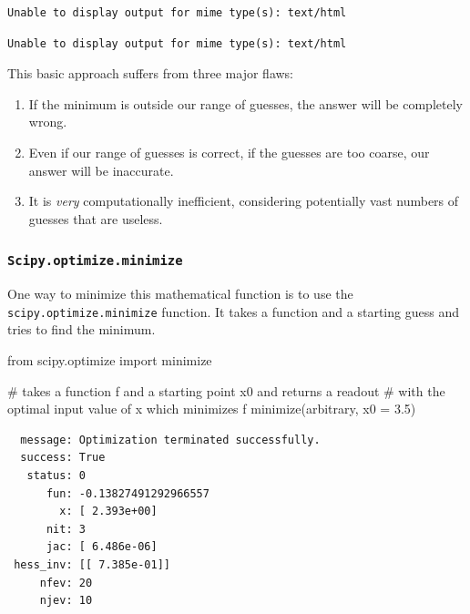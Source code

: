 \documentclass[
  letterpaper,
  DIV=11,
  numbers=noendperiod]{scrreprt}
\newenvironment{Shaded}{\begin{snugshade}}{\end{snugshade}}
\newcommand{\CommentTok}[1]{\textcolor[rgb]{0.37,0.37,0.37}{#1}}
\newcommand{\FloatTok}[1]{\textcolor[rgb]{0.68,0.00,0.00}{#1}}
\newcommand{\ImportTok}[1]{\textcolor[rgb]{0.00,0.46,0.62}{#1}}
\newcommand{\NormalTok}[1]{\textcolor[rgb]{0.00,0.23,0.31}{#1}}
\newcommand{\OperatorTok}[1]{\textcolor[rgb]{0.37,0.37,0.37}{#1}}
\providecommand{\tightlist}{%
  \setlength{\itemsep}{0pt}\setlength{\parskip}{0pt}}\usepackage{longtable,booktabs,array}
\begin{document}
\begin{verbatim}
Unable to display output for mime type(s): text/html
\end{verbatim}

\begin{verbatim}
Unable to display output for mime type(s): text/html
\end{verbatim}

This basic approach suffers from three major flaws:

\begin{enumerate}
\def\labelenumi{\arabic{enumi}.}
\tightlist
\item
  If the minimum is outside our range of guesses, the answer will be
  completely wrong.
\item
  Even if our range of guesses is correct, if the guesses are too
  coarse, our answer will be inaccurate.
\item
  It is \emph{very} computationally inefficient, considering potentially
  vast numbers of guesses that are useless.
\end{enumerate}

\subsubsection{\texorpdfstring{\texttt{Scipy.optimize.minimize}}{Scipy.optimize.minimize}}\label{scipy.optimize.minimize}

One way to minimize this mathematical function is to use the
\texttt{scipy.optimize.minimize} function. It takes a function and a
starting guess and tries to find the minimum.

\begin{Shaded}
\begin{Highlighting}[]
\ImportTok{from}\NormalTok{ scipy.optimize }\ImportTok{import}\NormalTok{ minimize}

\CommentTok{\# takes a function f and a starting point x0 and returns a readout }
\CommentTok{\# with the optimal input value of x which minimizes f}
\NormalTok{minimize(arbitrary, x0 }\OperatorTok{=} \FloatTok{3.5}\NormalTok{)}
\end{Highlighting}
\end{Shaded}

\begin{verbatim}
  message: Optimization terminated successfully.
  success: True
   status: 0
      fun: -0.13827491292966557
        x: [ 2.393e+00]
      nit: 3
      jac: [ 6.486e-06]
 hess_inv: [[ 7.385e-01]]
     nfev: 20
     njev: 10
\end{verbatim}
\end{document}
